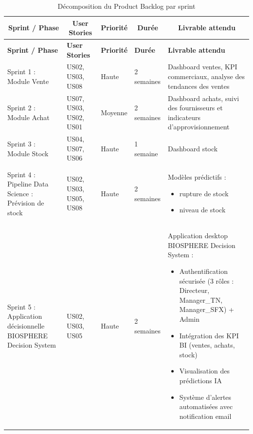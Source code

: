 {\small
\renewcommand{\arraystretch}{1.2}
\setlength{\tabcolsep}{3pt}


\begin{longtable}{|p{3.2cm}|p{2.5cm}|p{1.5cm}|p{1.8cm}|p{7.5cm}|}

\caption{Décomposition du Product Backlog par sprint} \\

\hline
\multicolumn{1}{|c|}{\textbf{Sprint / Phase}} & 
\multicolumn{1}{c|}{\textbf{User Stories}} & 
\multicolumn{1}{c|}{\textbf{Priorité}} & 
\multicolumn{1}{c|}{\textbf{Durée}} & 
\multicolumn{1}{c|}{\textbf{Livrable attendu}} \\
\hline
\endfirsthead

\hline
\textbf{Sprint / Phase} & \textbf{User Stories} & \textbf{Priorité} & \textbf{Durée} & \textbf{Livrable attendu} \\
\hline
\endhead

\hline
\endfoot

Sprint 1 : Module Vente & US02, US03, US08 & Haute & 2 semaines & Dashboard ventes, KPI commerciaux, analyse des tendances des ventes \\
\hline

Sprint 2 : Module Achat & US07, US03, US02, US01 & Moyenne & 2 semaines & Dashboard achats, suivi des fournisseurs et indicateurs d'approvisionnement \\
\hline

Sprint 3 : Module Stock & US04, US07, US06 & Haute & 1 semaine & Dashboard stock \\
\hline

Sprint 4 : Pipeline Data Science : Prévision de stock & US02, US03, US05, US08 & Haute & 2 semaines & Modèles prédictifs :
\begin{itemize}
\item rupture de stock
\item niveau de stock
\end{itemize} \\
\hline

Sprint 5 : Application décisionnelle BIOSPHERE Decision System & US02, US03, US05 & Haute & 2 semaines & Application desktop BIOSPHERE Decision System :
\begin{itemize}
\item Authentification sécurisée (3 rôles : Directeur, Manager\_TN, Manager\_SFX) + Admin
\item Intégration des KPI BI (ventes, achats, stock)
\item Visualisation des prédictions IA
\item Système d'alertes automatisées avec notification email
\end{itemize} \\
\hline

\end{longtable}

}

